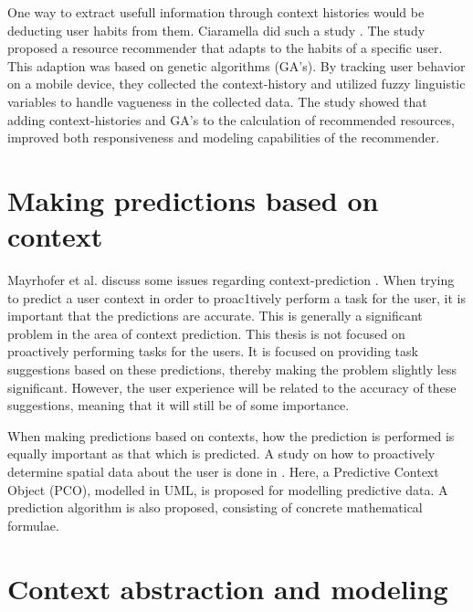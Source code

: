 One way to extract usefull information through context histories would be deducting user habits from them. Ciaramella did such a study \cite{ciaramella2010using}. The study proposed a resource recommender that adapts to the habits of a specific user. This adaption was based on genetic algorithms (GA's). By tracking user behavior on a mobile device, they collected the context-history and utilized fuzzy linguistic variables to handle vagueness in the collected data. The study showed that adding context-histories and GA's to the calculation of recommended resources, improved both responsiveness and modeling capabilities of the recommender.

\section{Making predictions based on context}

Mayrhofer et al. discuss some issues regarding context-prediction \cite{mayrhofer2005context}. When trying to predict a user context in order to proac1tively perform a task for the user, it is important that the predictions are accurate. This is generally a significant problem in the area of context prediction. This thesis is not focused on proactively performing tasks for the users. It is focused on providing task suggestions based on these predictions, thereby making the problem slightly less significant. However, the user experience will be related to the accuracy of these suggestions, meaning that it will still be of some importance.

When making predictions based on contexts, how the prediction is performed is equally important as that which is predicted. A study on how to proactively determine spatial data about the user is done in \cite{anagnostopoulos2005prediction}. Here, a Predictive Context Object (PCO), modelled in UML, is proposed for modelling predictive data. A prediction algorithm is also proposed, consisting of concrete mathematical formulae.

\section{Context abstraction and modeling}

